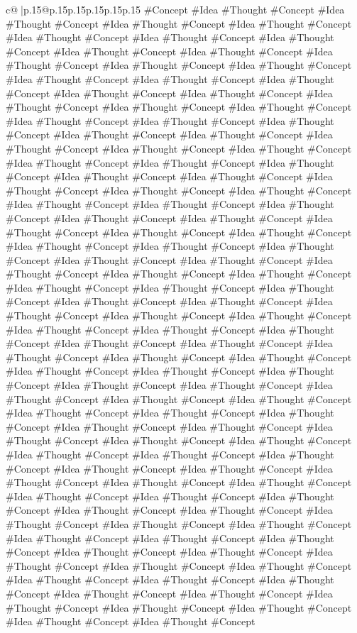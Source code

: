 \documentclass{article}
\begin{document}
{\begin{supertabular}{c@{$\;$}|p{.15\linewidth}@{}p{.15\linewidth}p{.15\linewidth}p{.15\linewidth}p{.15\linewidth}p{.15\linewidth}}
{{{\#Concept \#Idea \#Thought \#Concept \#Idea \#Thought \#Concept \#Idea \#Thought \#Concept \#Idea \#Thought \#Concept \#Idea \#Thought \#Concept \#Idea \#Thought \#Concept \#Idea \#Thought \#Concept \#Idea \#Thought \#Concept \#Idea \#Thought \#Concept \#Idea \#Thought \#Concept \#Idea \#Thought \#Concept \#Idea \#Thought \#Concept \#Idea \#Thought \#Concept \#Idea \#Thought \#Concept \#Idea \#Thought \#Concept \#Idea \#Thought \#Concept \#Idea \#Thought \#Concept \#Idea \#Thought \#Concept \#Idea \#Thought \#Concept \#Idea \#Thought \#Concept \#Idea \#Thought \#Concept \#Idea \#Thought \#Concept \#Idea \#Thought \#Concept \#Idea \#Thought \#Concept \#Idea \#Thought \#Concept \#Idea \#Thought \#Concept \#Idea \#Thought \#Concept \#Idea \#Thought \#Concept \#Idea \#Thought \#Concept \#Idea \#Thought \#Concept \#Idea \#Thought \#Concept \#Idea \#Thought \#Concept \#Idea \#Thought \#Concept \#Idea \#Thought \#Concept \#Idea \#Thought \#Concept \#Idea \#Thought \#Concept \#Idea \#Thought \#Concept \#Idea \#Thought \#Concept \#Idea \#Thought \#Concept \#Idea \#Thought \#Concept \#Idea \#Thought \#Concept \#Idea \#Thought \#Concept \#Idea \#Thought \#Concept \#Idea \#Thought \#Concept \#Idea \#Thought \#Concept \#Idea \#Thought \#Concept \#Idea \#Thought \#Concept \#Idea \#Thought \#Concept \#Idea \#Thought \#Concept \#Idea \#Thought \#Concept \#Idea \#Thought \#Concept \#Idea \#Thought \#Concept \#Idea \#Thought \#Concept \#Idea \#Thought \#Concept \#Idea \#Thought \#Concept \#Idea \#Thought \#Concept \#Idea \#Thought \#Concept \#Idea \#Thought \#Concept \#Idea \#Thought \#Concept \#Idea \#Thought \#Concept \#Idea \#Thought \#Concept \#Idea \#Thought \#Concept \#Idea \#Thought \#Concept \#Idea \#Thought \#Concept \#Idea \#Thought \#Concept \#Idea \#Thought \#Concept \#Idea \#Thought \#Concept \#Idea \#Thought \#Concept \#Idea \#Thought \#Concept \#Idea \#Thought \#Concept \#Idea \#Thought \#Concept \#Idea \#Thought \#Concept \#Idea \#Thought \#Concept \#Idea \#Thought \#Concept \#Idea \#Thought \#Concept \#Idea \#Thought \#Concept \#Idea \#Thought \#Concept \#Idea \#Thought \#Concept \#Idea \#Thought \#Concept \#Idea \#Thought \#Concept \#Idea \#Thought \#Concept \#Idea \#Thought \#Concept \#Idea \#Thought \#Concept \#Idea \#Thought \#Concept \#Idea \#Thought \#Concept \#Idea \#Thought \#Concept \#Idea \#Thought \#Concept \#Idea \#Thought \#Concept \#Idea \#Thought \#Concept \#Idea \#Thought \#Concept \#Idea \#Thought \#Concept \#Idea \#Thought \#Concept \#Idea \#Thought \#Concept \#Idea \#Thought \#Concept \#Idea \#Thought \#Concept \#Idea \#Thought \#Concept \#Idea \#Thought \#Concept \#Idea \#Thought \#Concept \#Idea \#Thought \#Concept \#Idea \#Thought \#Concept \#Idea \#Thought \#Concept \#Idea \#Thought \#Concept \#Idea \#Thought \#Concept \#Idea \#Thought \#Concept \#Idea \#Thought \#Concept \#Idea \#Thought \#Concept \#Idea \#Thought \#Concept \#Idea \#Thought \#Concept \#Idea \#Thought \#Concept \#Idea \#Thought \#Concept \#Idea \#Thought \#Concept \#Idea \#Thought \#Concept \#Idea \#Thought \#Concept \#Idea \#Thought \#Concept \#Idea \#Thought \#Concept \#Idea \#Thought \#Concept \#Idea \#Thought \#Concept \#Idea \#Thought \#Concept }}}
\end{supertabular}}
\end{document}
